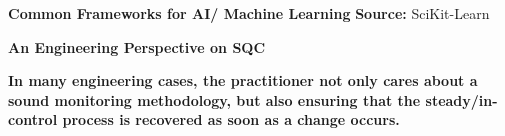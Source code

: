 \documentclass[aspectratio=43]{beamer}
\begin{document}
\begin{frame}{\textbf{Common Frameworks for AI/ Machine Learning}}
{    \tiny{\textbf{Source:} SciKit-Learn \cite{scikit2019choosing}}
    }
    
\end{frame}

\begin{frame}{\textbf{An Engineering Perspective on SQC}}
    
    
    \begin{eBox}
        \textbf{In many engineering cases, the practitioner not only cares about a sound monitoring methodology, but also ensuring that the steady/in-control process is recovered as soon as a change occurs.}
    \end{eBox}
    
    \vspace{2\baselineskip}

    

\end{frame}
\end{document}
